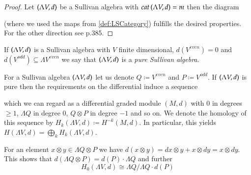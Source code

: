 \begin{proof}

 Let $(\Lambda V,d)$ be a Sullivan algebra with $cat \, (\Lambda V,d) = m$ then the diagram 

  \centerline{
  }
(where we used the maps from \ref{def:LSCategory}) fulfills the desired properties.
For the other direction see \cite{Felix2001} p.385.

% 
% 
 
\end{proof}

\begin{Definition}
 If $(\Lambda V,d)$ is a Sullivan algebra with $V$ finite dimensional, $d(V^{even}) = 0$
 and $d(V^{odd}) \subseteq \Lambda V^{even}$ we say that $(\Lambda V,d)$ is a \emph{pure Sullivan algebra}.
\end{Definition}

For a Sullivan algebra $(\Lambda V,d)$ let us denote $ Q \coloneqq V^{even}$ and $P \coloneqq V^{odd}$.
If $(\Lambda V,d)$ is pure then the requirements on the differential induce a sequence

\centerline{
}

which we can regard as a differential graded module $(M,d)$ with $0$ in degrees $\geq 1$, $\Lambda Q$ in degree $0$,
$Q \otimes P$ in degree $-1$ and so on.
We denote the homology of this sequence by $H_k(\Lambda V,d) \coloneqq H^{-k}(M,d)$. In particular, this yields
$ H(\Lambda V,d) = \bigoplus_k H_k(\Lambda V,d)$. \par
For an element $x \otimes y \in \Lambda Q \otimes P$ we have 
$ d( x \otimes y) = dx \otimes y + x \otimes dy = x \otimes dy$. This shows that
$d( \Lambda Q \otimes P) = d(P) \cdot \Lambda Q$ and further
$$H_0(\Lambda V, d) \cong \Lambda Q / \Lambda Q \cdot d(P)$$

